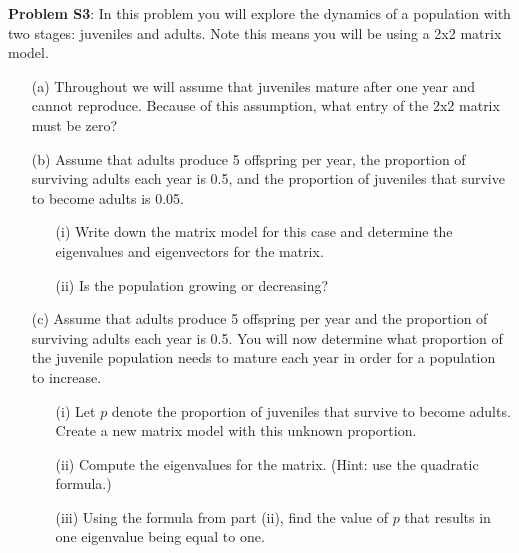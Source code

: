 \documentclass[12pt]{article}
\begin{document}
\noindent \textbf{Problem S3}: In this problem you will explore the dynamics of 
a population with two stages: juveniles and adults.  Note this means you will be
using a 2x2 matrix model. 
\begin{itemize}
\item[(a)] Throughout we will assume that juveniles mature after one year and 
cannot reproduce.  Because of this assumption, what entry of the 2x2 matrix must
be zero?
\item[(b)] Assume that adults produce 5 offspring per year, the proportion of 
surviving adults each year is 0.5, and the proportion of juveniles that survive 
to become adults is 0.05.
\begin{itemize}
\item[(i)] Write down the matrix model for this case and determine the 
eigenvalues and eigenvectors for the matrix.
\item[(ii)] Is the population growing or decreasing?
\end{itemize}
\item[(c)] Assume that adults produce 5 offspring per year and the proportion of
surviving adults each year is 0.5. You will now determine what proportion of the
juvenile population needs to mature each year in order for a population to 
increase.
\begin{itemize}
\item[(i)] Let $p$ denote the proportion of juveniles that survive to become 
adults. Create a new matrix model with this unknown proportion.  
\item[(ii)] Compute the eigenvalues for the matrix. (Hint: use the quadratic 
formula.)
\item[(iii)] Using the formula from part (ii), find the value of $p$ that 
results in one eigenvalue being equal to one. 
\end{itemize}
\end{itemize}
\end{document}
